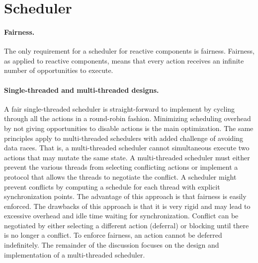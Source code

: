 \section{Scheduler}

\paragraph{Fairness.}
The only requirement for a scheduler for reactive components is fairness.
Fairness, as applied to reactive components, means that every action receives an infinite number of opportunities to execute.

\paragraph{Single-threaded and multi-threaded designs.}
A fair single-threaded scheduler is straight-forward to implement by cycling through all the actions in a round-robin fashion.
Minimizing scheduling overhead by not giving opportunities to disable actions is the main optimization.
The same principles apply to multi-threaded schedulers with added challenge of avoiding data races.
That is, a multi-threaded scheduler cannot simultaneous execute two actions that may mutate the same state.
A multi-threaded scheduler must either prevent the various threads from selecting conflicting actions or implement a protocol that allows the threads to negotiate the conflict.
A scheduler might prevent conflicts by computing a schedule for each thread with explicit synchronization points.
The advantage of this approach is that fairness is easily enforced.
The drawbacks of this approach is that it is very rigid and may lead to excessive overhead and idle time waiting for synchronization.
Conflict can be negotiated by either selecting a different action (deferral) or blocking until there is no longer a conflict.
To enforce fairness, an action cannot be deferred indefinitely.
The remainder of the discussion focuses on the design and implementation of a multi-threaded scheduler.


